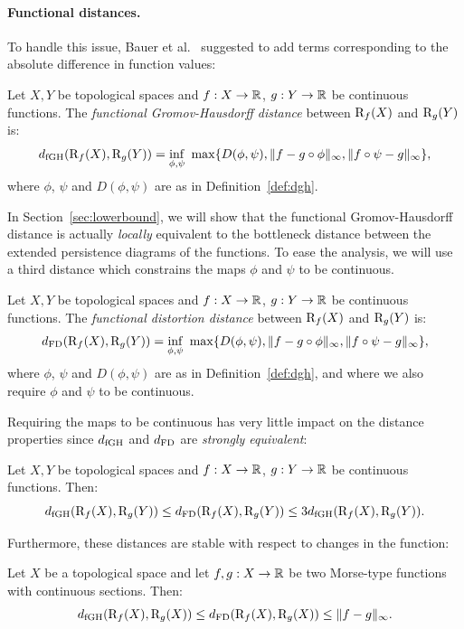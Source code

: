 \paragraph*{Functional distances.}
To handle this issue, Bauer et al.~\cite{Bauer13a} suggested to add terms corresponding
to the absolute difference in function values:
%
\begin{defin}\label{def:dfgh}
Let $X,Y$ be topological spaces and $f:X\rightarrow\mathbb{R}$, $g:Y\rightarrow\mathbb{R}$ be continuous functions.
The {\em functional Gromov-Hausdorff distance} between $\mathrm{R}_f(X)$ and $\mathrm{R}_g(Y)$ is:
\begin{equation}\label{eq:dfgh}
\distfgh(\Reeb_f(X),\Reeb_g(Y))=\underset{\phi,\psi}{\rm inf}\ \max\{D(\phi,\psi),\|f-g\circ\phi\|_\infty,\|f\circ\psi-g\|_\infty\},
\end{equation}
where $\phi$, $\psi$ and $D(\phi,\psi)$ are as in Definition~\ref{def:dgh}. 
\end{defin}
%
In Section~\ref{sec:lowerbound}, we will show that the functional Gromov-Hausdorff distance is actually {\em locally}
equivalent to the bottleneck distance between the extended persistence diagrams of the functions. To ease the analysis,
we will use a third distance which constrains the maps $\phi$ and $\psi$ to be continuous.
%
\begin{defin}\label{def:dfd}
Let $X,Y$ be topological spaces and $f:X\rightarrow\mathbb{R}$, $g:Y\rightarrow\mathbb{R}$ be continuous functions.
The {\em functional distortion distance} between $\mathrm{R}_f(X)$ and $\mathrm{R}_g(Y)$ is:
\begin{equation}\label{eq:dfd}
\distfd(\Reeb_f(X),\Reeb_g(Y))=\underset{\phi,\psi}{\rm inf}\ \max\{D(\phi,\psi),\|f-g\circ\phi\|_\infty,\|f\circ\psi-g\|_\infty\},
\end{equation}
where $\phi$, $\psi$ and $D(\phi,\psi)$ are as in Definition~\ref{def:dgh}, and where we also require
$\phi$ and $\psi$ to be continuous. 
\end{defin}
%
Requiring the maps to be continuous has very little impact on the distance properties since $d_{\rm fGH}$ and $d_{\rm FD}$ are {\em strongly equivalent}:
%
\begin{thm}\label{th:dfddfgheq}
Let $X,Y$ be topological spaces and $f:X\rightarrow\mathbb{R}$, $g:Y\rightarrow\mathbb{R}$ be continuous functions.
Then: $$d_{\rm fGH}(\mathrm{R}_f(X),\mathrm{R}_g(Y))\leq d_{\rm FD}(\mathrm{R}_f(X),\mathrm{R}_g(Y))\leq3d_{\rm fGH}(\mathrm{R}_f(X),\mathrm{R}_g(Y)).$$
\end{thm}
%
Furthermore, these distances are stable with respect to changes in the function:
%
\begin{thm}\label{th:dfdstab}
Let $X$ be a topological space and let $f,g:X\rightarrow\mathbb{R}$ be two Morse-type functions with continuous sections.
Then:
$$d_{\rm fGH}(\mathrm{R}_f(X),\mathrm{R}_g(X))\leq d_{\rm FD}(\mathrm{R}_f(X),\mathrm{R}_g(X))\leq \|f-g\|_\infty.$$
\end{thm}




